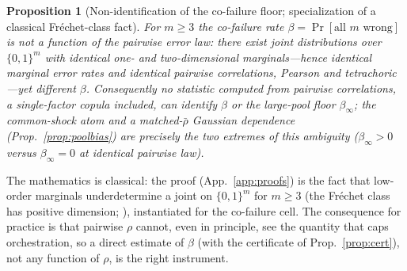 \documentclass[11pt]{article}
\theoremstyle{plain}
\newtheorem{proposition}{Proposition}
\theoremstyle{definition}
\begin{document}
\begin{proposition}[Non-identification of the co-failure floor; specialization of a classical Fr\'echet-class fact]\label{prop:nonid}
For $m\ge3$ the co-failure rate $\beta=\Pr[\text{all }m\text{ wrong}]$ is \emph{not} a function of the pairwise error law:
there exist joint distributions over $\{0,1\}^m$ with identical one- and two-dimensional marginals---hence identical marginal
error rates and identical pairwise correlations, Pearson \emph{and} tetrachoric---yet different $\beta$. Consequently no
statistic computed from pairwise correlations, a single-factor copula included, can identify $\beta$ or the large-pool floor
$\beta_\infty$; the common-shock atom and a matched-$\bar\rho$ Gaussian dependence (Prop.~\ref{prop:poolbias}) are precisely the
two extremes of this ambiguity ($\beta_\infty>0$ versus $\beta_\infty=0$ at identical pairwise law).
\end{proposition}
\noindent The mathematics is classical: the proof (App.~\ref{app:proofs}) is the fact that low-order
marginals underdetermine a joint on $\{0,1\}^m$ for $m\ge3$ (the Fr\'echet class has positive dimension;
\citealp{fontana2018representation}), instantiated for the co-failure cell. The consequence for practice is that pairwise $\rho$ cannot, even in principle, see the
quantity that caps orchestration, so a direct estimate of $\beta$ (with the certificate of Prop.~\ref{prop:cert}), not any function of $\rho$, is
the right instrument.
\end{document}
